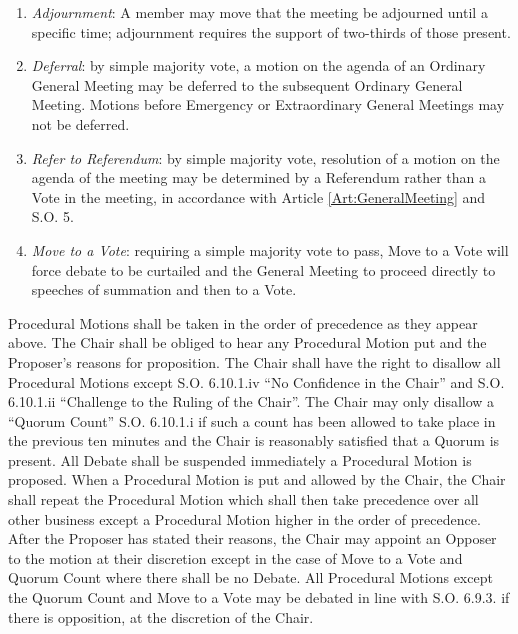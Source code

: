 \begin{enumerate}
\item \textit{Adjournment}: A member may move that the meeting be adjourned until a specific time; adjournment requires the support of two-thirds of those present.
\item \textit{Deferral}: by simple majority vote, a motion on the agenda of an Ordinary General Meeting may be deferred to the subsequent Ordinary General Meeting. Motions before Emergency or Extraordinary General Meetings may not be deferred.
\item \textit{Refer to Referendum}: by simple majority vote, resolution of a motion on the agenda of the meeting may be determined by a Referendum rather than a Vote in the meeting, in accordance with Article \ref{Art:GeneralMeeting} and S.O. 5.
\item \textit{Move to a Vote}: requiring a simple majority vote to pass, Move to a Vote will force debate to be curtailed and the General Meeting to proceed directly to speeches of summation and then to a Vote.
\end{enumerate}
\npara Procedural Motions shall be taken in the order of precedence as they appear above.
\npara The Chair shall be obliged to hear any Procedural Motion put and the Proposer's reasons for proposition.
\npara The Chair shall have the right to disallow all Procedural Motions except S.O. 6.10.1.iv ``No Confidence in the Chair'' and S.O. 6.10.1.ii ``Challenge to the Ruling of the Chair''. The Chair may only disallow a ``Quorum Count'' S.O. 6.10.1.i if such a count has been allowed to take place in the previous ten minutes and the Chair is reasonably satisfied that a Quorum is present.
\npara All Debate shall be suspended immediately a Procedural Motion is proposed.
\npara When a Procedural Motion is put and allowed by the Chair, the Chair shall repeat the Procedural Motion which shall then take precedence over all other business except a Procedural Motion higher in the order of precedence. After the Proposer has stated their reasons, the Chair may appoint an Opposer to the motion at their discretion except in the case of Move to a Vote and Quorum Count where there shall be no Debate. All Procedural Motions except the Quorum Count and Move to a Vote may be debated in line with S.O. 6.9.3. if there is opposition, at the discretion of the Chair.




